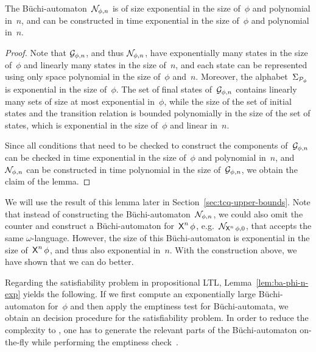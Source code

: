 \begin{lemma}\label{lem:ba-phi-n-exp}
    The Büchi-automaton~$\mathcal{N}_{\phi,n}$ is of size exponential in the size
    of~$\phi$ and polynomial in~$n$, and can be constructed in time exponential in
    the size of~$\phi$ and polynomial in~$n$.
\end{lemma}

\begin{proof}
    Note that $\mathcal{G}_{\phi,n}$, and thus $\mathcal{N}_{\phi,n}$, have exponentially
    many states in the size of~$\phi$ and linearly many states in the size
    of~$n$, and each state can be represented using only space polynomial in the
    size of~$\phi$ and~$n$.
    Moreover, the alphabet~$\Sigma_{\mathcal{P}_\phi}$ is exponential in the size
    of~$\phi$.  The set of final states of~$\mathcal{G}_{\phi,n}$ contains linearly
    many sets of size at most exponential in~$\phi$, while the size of the set
    of initial states and the transition relation is bounded polynomially in the
    size of the set of states, which is exponential in the size of~$\phi$ and
    linear in~$n$.

    Since all conditions that need to be checked to construct the components
    of~$\mathcal{G}_{\phi,n}$ can be checked in time exponential in the size of~$\phi$
    and polynomial in~$n$, and $\mathcal{N}_{\phi,n}$ can be constructed in time
    polynomial in the size of~$\mathcal{G}_{\phi,n}$, we obtain the claim of the lemma.
\end{proof}

\noindent
We will use the result of this lemma later in
Section~\ref{sec:tcq-upper-bounds}.  Note that instead of constructing the
Büchi-automaton~$\mathcal{N}_{\phi,n}$, we could also omit the counter and construct a
Büchi-automaton for~$\operatorname{\mathsf{X}}^n\phi$, e.g.~$\mathcal{N}_{\operatorname{\mathsf{X}}^n\phi,0}$, that accepts the
same $\omega$-language.  However, the size of this Büchi-automaton is
exponential in the size of~$\operatorname{\mathsf{X}}^n\phi$, and thus also exponential in~$n$.
With the construction above, we have shown that we can do better.

Regarding the satisfiability problem in propositional LTL,
Lemma~\ref{lem:ba-phi-n-exp} yields the following.  If we first compute an
exponentially large Büchi-automaton for~$\phi$ and then apply the emptiness test
for Büchi-automata, we obtain an \ExpTime decision procedure for the
satisfiability problem.  In order to reduce the complexity to \PSpace, one has
to generate the relevant parts of the Büchi-automaton on-the-fly while
performing the emptiness check~\cite{SiCl-JACM85,LiPZ-CLP85}.

